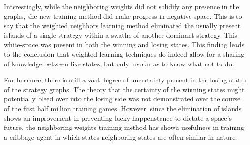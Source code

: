 Interestingly,
while the neighboring weights did not solidify any presence in the graphs,
the new training method did make progress in negative space.
%
This is to say that
the weighted neighbors learning method eliminated the usually present islands
of a single strategy within a swathe of another dominant strategy.
%
This white-space was present in both the winning and losing states.
%
This finding leads to the conclusion that weighted learning techniques
do indeed allow for a sharing of knowledge between like states,
but only insofar as to know what not to do.

Furthermore,
there is still a vast degree of uncertainty present in the losing states of
the strategy graphs.
%
The theory that the certainty of the winning states might potentially
bleed over into the losing side was not demonstrated over the course of
the first half million training games.
%
However,
since the elimination of islands shows an improvement in
preventing lucky happenstance to dictate a space's future,
the neighboring weights training method has shown usefulness in training a
cribbage agent in which states neighboring states are often similar in nature.

